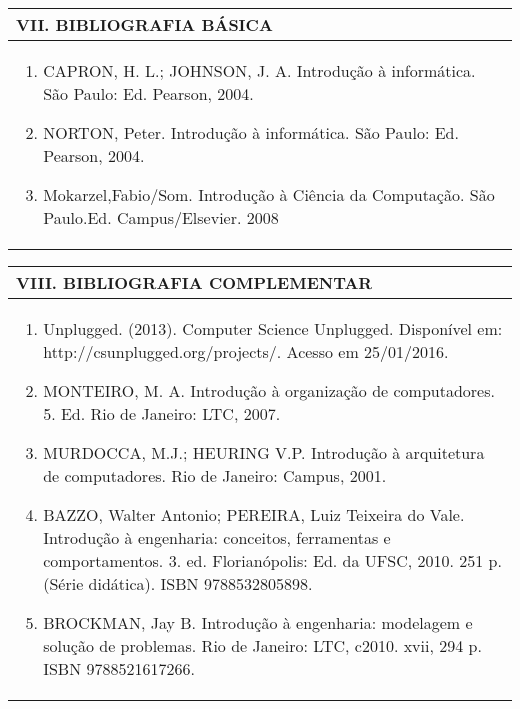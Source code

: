 \documentclass[12pt]{article}
\begin{document}

\begin{longtable}{|L{1.025\textwidth}|} \hline
%
{\bf VII. BIBLIOGRAFIA BÁSICA} \\ \hline
\begin{enumerate}
%
\item CAPRON, H. L.; JOHNSON, J. A. Introdução à informática. São Paulo: Ed. Pearson, 2004.
\item NORTON, Peter. Introdução à informática. São Paulo: Ed. Pearson, 2004. 
\item Mokarzel,Fabio/Som. Introdução à Ciência da Computação. São Paulo.Ed. Campus/Elsevier. 2008
\end{enumerate}
 \\ \hline
\end{longtable}



\begin{longtable}{|L{1.025\textwidth}|} \hline
%
{\bf VIII. BIBLIOGRAFIA COMPLEMENTAR} \\ \hline
\begin{enumerate}
\item Unplugged. (2013). Computer Science Unplugged. Disponível em: http://csunplugged.org/projects/. Acesso em 25/01/2016. 
\item MONTEIRO, M. A. Introdução à organização de computadores. 5. Ed. Rio de Janeiro: LTC, 2007. 
\item MURDOCCA, M.J.; HEURING V.P. Introdução à arquitetura de computadores. Rio de Janeiro: Campus, 2001.
\item BAZZO, Walter Antonio; PEREIRA, Luiz Teixeira do Vale. Introdução à engenharia: conceitos, ferramentas e comportamentos. 3. ed. Florianópolis: Ed. da UFSC, 2010. 251 p. (Série didática). ISBN 9788532805898.
\item BROCKMAN, Jay B. Introdução à engenharia: modelagem e solução de problemas. Rio de Janeiro: LTC, c2010. xvii, 294 p. ISBN 9788521617266.
\end{enumerate}
 \\ \hline
\end{longtable}



\end{document}
